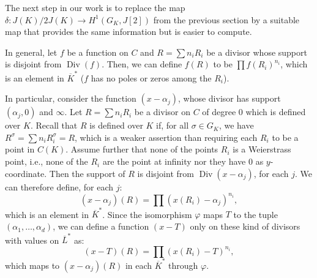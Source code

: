 \documentclass[a4paper, 12pt]{amsart}
\theoremstyle{definition}
\theoremstyle{plain}
\theoremstyle{plain}
\theoremstyle{plain}
\theoremstyle{plain}
\theoremstyle{remark}
\theoremstyle{remark}
\theoremstyle{plain}
\DeclareMathOperator{\Div}{Div}
\begin{document}
	The next step in our work is to replace the map $\delta:J(K)/2J(K)\rightarrow H^1(G_K,J[2])$ from the previous section by a suitable map that provides the same information but is easier to compute.
	
	In general, let $f$ be a function on $C$ and $R=\sum n_iR_i$ be a divisor whose support is disjoint from $\Div(f)$. Then, we can define $f(R)$ to be $\prod f(R_i)^{n_i}$, which is an element in $\overline{K}^*$ ($f$ has no poles or zeros among the $R_i$).
	
	In particular, consider the function $(x-\alpha_j)$, whose divisor has support $(\alpha_j,0)$ and $\infty$. Let $R=\sum n_i R_i$ be a divisor on $C$ of degree 0 which is defined over $K$. Recall that $R$ is defined over $K$ if, for all $\sigma\in G_K$, we have $R^\sigma=\sum n_iR_i^\sigma=R$, which is a weaker assertion than requiring each $R_i$ to be a point in $C(K)$. Assume further that none of the points $R_i$ is a Weierstrass point, i.e., none of the $R_i$ are the point at infinity nor they have $0$ as $y$-coordinate. Then the support of $R$ is disjoint from $\Div(x-\alpha_j)$, for each $j$. We can therefore define, for each $j$:
	\begin{equation*}
		(x-\alpha_j)(R)=\prod(x(R_i)-\alpha_j)^{n_i},
	\end{equation*}
	which is an element in $\overline{K}^*$. Since the isomorphism $\varphi$ maps $T$ to the tuple $(\alpha_1,\ldots,\alpha_d)$, we can define a function $(x-T)$ only on these kind of divisors with values on $\overline{L}^*$ as:
	\begin{equation*}
		(x-T)(R)=\prod (x(R_i)-T)^{n_i},
	\end{equation*}
	which maps to $(x-\alpha_j)(R)$ in each $\overline{K}^*$ through $\varphi$.
	
\end{document}
